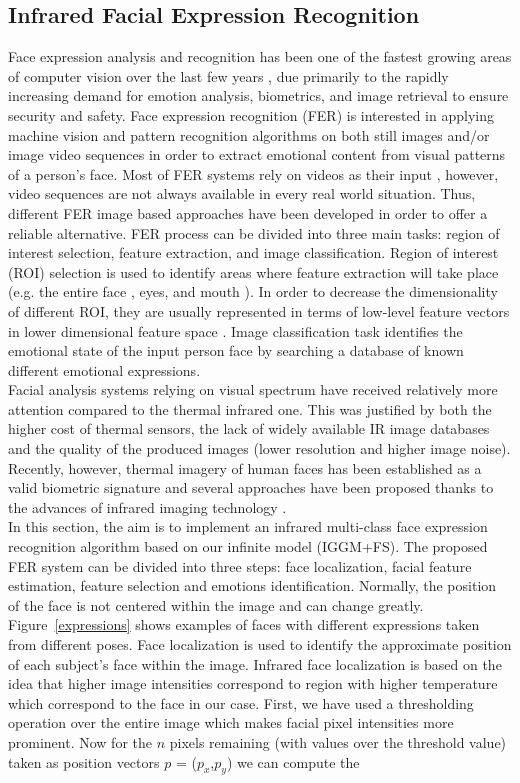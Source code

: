 \documentclass[journal,10pt]{elsart}
\begin{document}
\subsection{Infrared Facial Expression Recognition}
Face expression analysis and recognition has been one of the fastest growing areas of computer vision over the last few years \cite{Pantic2000,Fasel2003}, due primarily to the rapidly increasing demand for emotion analysis, biometrics, and image retrieval to ensure security and safety. Face expression recognition (FER) is interested in applying machine vision and pattern recognition algorithms on both still images and/or image video sequences in order to extract emotional content from visual patterns of a person's face. Most of FER systems rely on videos as their input \cite{Panticc2000,Tian2001}, however, video sequences are not always available in every real world situation. Thus, different FER image based approaches have been developed \cite{Pantic2000,Lyons1999} in order to offer a reliable alternative. FER process can be divided into three main tasks: region of interest selection, feature extraction, and image classification. Region of interest (ROI) selection is used to identify areas where feature extraction will take place (e.g. the entire face \cite{Lyons1999}, eyes, and mouth \cite{Donato1999}). In order to decrease the dimensionality of different ROI, they are usually represented in terms of low-level feature vectors in lower dimensional feature space \cite{Lyons1999,Donato1999}. Image classification task identifies the emotional state of the input person face by searching a database of known different emotional expressions. \\Facial analysis systems relying on visual spectrum have received relatively more attention compared to the thermal infrared one. This was justified by both the higher cost of thermal sensors, the lack of widely available IR image databases and the quality of the produced images (lower resolution and higher image noise).  Recently, however, thermal imagery of human faces has been established as a valid biometric signature and several approaches have been proposed thanks to the advances of infrared imaging technology \cite{990519,Prokoski2000}. \\In this section, the aim is to implement an infrared multi-class face expression recognition algorithm based on our infinite model (IGGM+FS). The proposed FER system can be divided into three steps: face localization, facial feature estimation, feature selection and emotions identification. Normally, the position of the face is not centered within the image and can change greatly. Figure~\ref{expressions} shows examples of faces with different expressions taken from different poses. Face localization is used to identify the approximate position of each subject's face within the image. Infrared face localization is based on the idea that higher image intensities correspond to region with higher temperature which correspond to the face in our case. First, we have used a thresholding operation over the entire image which makes facial pixel intensities more prominent. Now for the $n$ pixels remaining (with values over the threshold value) taken as position vectors $p$ = ($p_x$,$p_y$) we can compute the 
\end{document}
